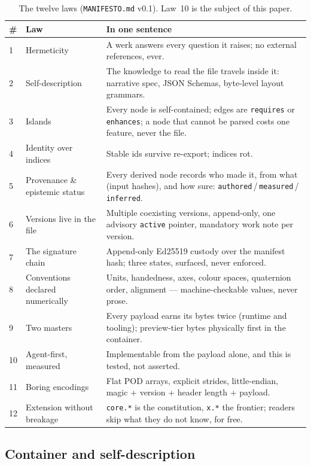\documentclass[10pt,twocolumn,letterpaper]{article}
\newcommand{\code}[1]{\texttt{\small #1}}
\begin{document}
\begin{table}[t]
\caption{The twelve laws (\code{MANIFESTO.md} v0.1). Law~10 is the subject of
this paper.}
\label{tab:laws}
\small
\begin{tabular}{@{}L{0.5cm}L{2.1cm}L{4.6cm}@{}}
\toprule
\# & Law & In one sentence \\
 & Hermeticity & A werk answers every question it raises; no external references, ever. \\
2 & Self-description & The knowledge to read the file travels inside it: narrative spec, JSON Schemas, byte-level layout grammars. \\
3 & Islands & Every node is self-contained; edges are \code{requires} or \code{enhances}; a node that cannot be parsed costs one feature, never the file. \\
4 & Identity over indices & Stable ids survive re-export; indices rot. \\
5 & Provenance \& epistemic status & Every derived node records who made it, from what (input hashes), and how sure: \code{authored}\,/\,\code{measured}\,/\,\code{inferred}. \\
6 & Versions live in the file & Multiple coexisting versions, append-only, one advisory \code{active} pointer, mandatory work note per version. \\
7 & The signature chain & Append-only Ed25519 custody over the manifest hash; three states, surfaced, never enforced. \\
8 & Conventions declared numerically & Units, handedness, axes, colour spaces, quaternion order, alignment --- machine-checkable values, never prose. \\
9 & Two masters & Every payload earns its bytes twice (runtime and tooling); preview-tier bytes physically first in the container. \\
10 & Agent-first, measured & Implementable from the payload alone, and this is tested, not asserted. \\
11 & Boring encodings & Flat POD arrays, explicit strides, little-endian, magic + version + header length + payload. \\
12 & Extension without breakage & \code{core.*} is the constitution, \code{x.*} the frontier; readers skip what they do not know, for free. \\
\bottomrule
\end{tabular}
\end{table}

\subsection{Container and self-description}
\end{document}
